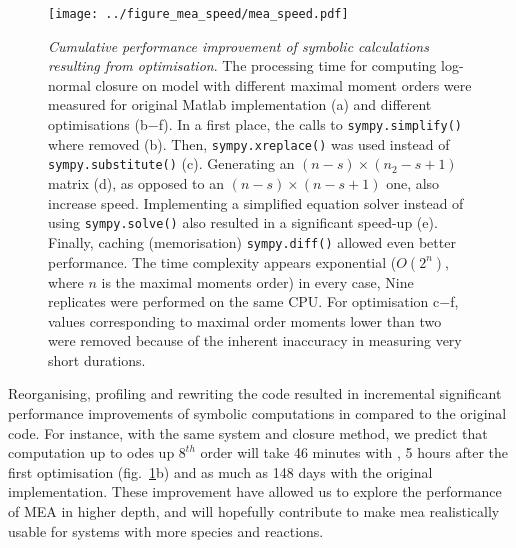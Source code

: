 \begin{figure}[tbh]

\texttt{[image: ../figure\_mea\_speed/mea\_speed.pdf]}
\caption{\emph{Cumulative performance improvement of symbolic 
calculations resulting from optimisation}.
The processing time for computing log-normal closure on \pft{} model with different maximal moment orders were measured for original Matlab implementation (a) and different optimisations (b$-$f).
In a first place, the calls to \texttt{sympy.simplify()} where removed (b). 
Then, \texttt{sympy.xreplace()} was used instead of \texttt{sympy.substitute()} (c). 
Generating an $(n-s) \times (n_2-s + 1)$ matrix (d), as opposed to an $(n-s) \times (n-s + 1)$ one, also increase speed.
Implementing a simplified equation solver instead of using \texttt{sympy.solve()} also resulted in a significant speed-up (e). 
Finally, caching (memorisation) \texttt{sympy.diff()} allowed even better performance.
The time complexity appears exponential ($O(2^n)$, where $n$ is the maximal moments order) in every case, 
Nine replicates were performed on the same CPU. 
For optimisation c$-$f, values corresponding to maximal order moments lower than two were removed because of the inherent inaccuracy in measuring very short durations.
}
\label{fig:mea_speed}
\end{figure}


Reorganising, profiling and rewriting the code resulted in incremental significant performance improvements of symbolic computations in \means{} compared to the original \mat{} code.
For instance, with the same \pft{} system and closure method, 
we predict that computation up to \gls{ode}s up $8^{th}$ order will take 46 minutes with \means{}, 5 hours after the first optimisation (fig.~\ref{fig:mea_speed}b) and as much as 148 days with the original implementation.
These improvement have allowed us to explore the performance of MEA in higher depth, and will hopefully contribute to make \gls{mea} realistically usable for systems with more species and reactions.

